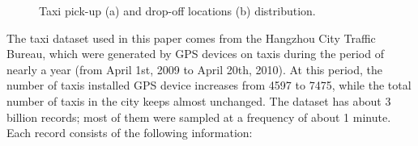\documentclass[a4paper, 10pt, conference]{ieeeconf}      %
\begin{document}
\begin{figure}[htbp]
    \centering
    \vspace{1mm} 
    \caption{ Taxi pick-up (a) and drop-off locations (b) distribution. }
    \label{fig:my_png_1}
\end{figure}



The taxi dataset used in this paper comes from the Hangzhou City Traffic Bureau, which were generated by GPS devices on taxis during the period of nearly a year (from April 1st, 2009 to April 20th, 2010). At this period, the number of taxis installed GPS device increases from 4597 to 7475, while the total number of taxis in the city keeps almost unchanged. The dataset has about 3 billion records; most of them were sampled at a frequency of about 1 minute. Each record consists of the following information:
\end{document}
